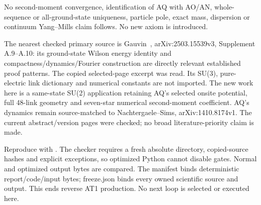 No second-moment convergence, identification of AQ with AO/AN, whole-sequence or all-ground-state uniqueness, particle pole, exact mass, dispersion or continuum Yang--Mills claim follows. No new axiom is introduced.

The nearest checked primary source is Gauvin~\citep{gauvin2026}, arXiv:2503.15539v3, Supplement A.9--A.10: its ground-state Wilson energy identity and compactness/dynamics/Fourier construction are directly relevant established proof patterns. The copied selected-page excerpt was read. Its SU(3), pure-electric link dictionary and numerical constants are not imported. The new work here is a same-state SU(2) application retaining AQ's selected onsite potential, full 48-link geometry and seven-star numerical second-moment coefficient. AQ's dynamics remain source-matched to Nachtergaele--Sims, arXiv:1410.8174v1. The current abstract/version pages were checked; no broad literature-priority claim is made.

Reproduce with {\small{}}. The checker requires a fresh absolute directory, copied-source hashes and explicit exceptions, so optimized Python cannot disable gates. Normal and optimized output bytes are compared. The manifest binds deterministic report/code/input bytes; freeze.json binds every owned scientific source and output. This ends reverse AT1 production. No next loop is selected or executed here.

